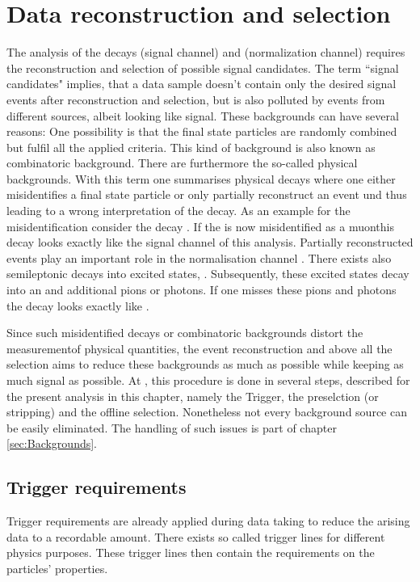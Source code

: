 \chapter{Data reconstruction and selection}
\label{sec:Selection}

The analysis of the decays \LbToDpmunuX (signal channel)  and \LbToLcmunu (normalization channel) requires the reconstruction and selection of possible signal candidates.
The term ``signal candidates" implies, that a data sample doesn't contain only the desired signal events after reconstruction and selection, but is also polluted by events from different sources, albeit looking like signal.
These backgrounds can have several reasons: 
One possibility is that the final state particles are randomly combined but fulfil all the applied criteria. 
This kind of background is also known as combinatoric background.
There are furthermore the so-called physical backgrounds.
With this term one summarises physical decays where one either misidentifies a final state particle or only partially reconstruct an event und thus leading to a wrong interpretation of the decay.
As an example for the misidentification consider the decay \decay{\Lb}{\Dz\proton\pim}. If the \pim is now misidentified as a muonthis decay looks exactly like the signal channel of this analysis.
Partially reconstructed events play an important role in the normalisation channel \LbToLcmunu.
There exists also semileptonic \Lb decays into excited \Lcstar states, \decay{\Lb}{\Lcstar\mun\neumb}.
Subsequently, these excited \Lcstar states decay into an \Lc and additional pions or photons.
If one misses these pions and photons the decay looks exactly like \LbToLcmunu.

Since such misidentified decays or combinatoric backgrounds distort the measurementof physical quantities, the event reconstruction and above all the selection aims to reduce these backgrounds as much as possible while keeping as much signal as possible.
At \lhcb, this procedure is done in several steps, described for the present analysis in this chapter, namely the Trigger, the preselction (or stripping) and the offline selection. 
Nonetheless not every background source can be easily eliminated. 
The handling of such issues is part of chapter \ref{sec:Backgrounds}.

\section{Trigger requirements}
Trigger requirements are already applied during data taking to reduce the arising data to a recordable amount.
There exists so called trigger lines for different physics purposes. 
These trigger lines then contain the requirements on the particles' properties.

